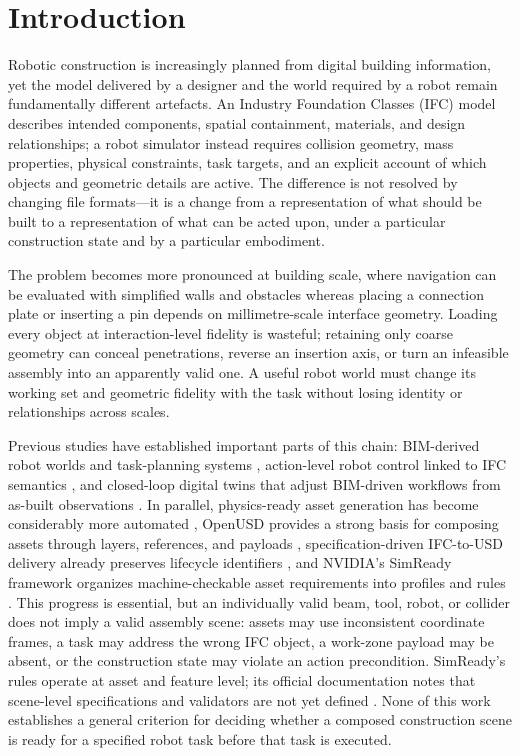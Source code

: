\section{Introduction}
\label{sec:introduction}

Robotic construction is increasingly planned from digital building
information, yet the model delivered by a designer and the world required by
a robot remain fundamentally different artefacts. An Industry Foundation
Classes (IFC) model describes intended components, spatial containment,
materials, and design relationships; a robot simulator instead requires
collision geometry, mass properties, physical constraints, task targets, and
an explicit account of which objects and geometric details are active. The
difference is not resolved by changing file formats---it is a change from a
representation of what should be built to a representation of what can be
acted upon, under a particular construction state and by a particular
embodiment.

The problem becomes more pronounced at building scale, where navigation can
be evaluated with simplified walls and obstacles whereas placing a
connection plate or inserting a pin depends on millimetre-scale interface
geometry. Loading every object at interaction-level fidelity is wasteful;
retaining only coarse geometry can conceal penetrations, reverse an
insertion axis, or turn an infeasible assembly into an apparently valid one.
A useful robot world must change its working set and geometric fidelity with
the task without losing identity or relationships across scales.

Previous studies have established important parts of this chain: BIM-derived
robot worlds and task-planning systems
\cite{kim2021bimrobot,zhu2023ifcsdf,oyediran2025fourdbim}, action-level
robot control linked to IFC semantics \cite{zhu2024rcan}, and closed-loop
digital twins that adjust BIM-driven workflows from as-built observations
\cite{wang2024closeddt}. In parallel, physics-ready asset generation has
become considerably more automated \cite{xu2024physics}, OpenUSD provides a
strong basis for composing assets through layers, references, and payloads
\cite{openUSD}, specification-driven IFC-to-USD delivery already preserves
lifecycle identifiers \cite{ren2025ifcusd}, and NVIDIA's SimReady framework
organizes machine-checkable asset requirements into profiles and rules
\cite{nvidiaSimReadyWorkflow}. This progress is essential, but an
individually valid beam, tool, robot, or collider does not imply a valid
assembly scene: assets may use inconsistent coordinate frames, a task may
address the wrong IFC object, a work-zone payload may be absent, or the
construction state may violate an action precondition. SimReady's rules
operate at asset and feature level; its official documentation notes that
scene-level specifications and validators are not yet defined
\cite{nvidiaSimReadyFAQ}. None of this work establishes a general criterion
for deciding whether a composed construction scene is ready for a specified
robot task before that task is executed.

